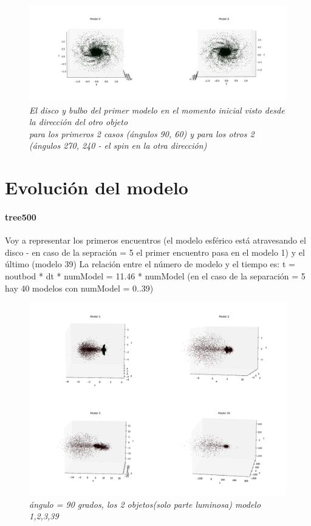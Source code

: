 \documentclass[12pt]{article} %
\renewcommand{\=}[1]{\stackrel{#1}{=}} %
\theoremstyle{definition}
\theoremstyle{remark}
\begin{document}
\begin{figure}[!ht]
 \centering
 \includegraphics[scale=0.2]{inimoddisco_sep5.png}
 \caption{\emph{El disco y bulbo del primer modelo en el momento inicial visto desde la dirección del otro objeto \\
para los primeros 2 casos (ángulos 90, 60) y para los otros 2 (ángulos 270, 240 - el spin en la otra dirección)}}
\end{figure}





\newpage
\section*{Evolución del modelo}
\paragraph{tree500}



Voy a representar los primeros encuentros (el modelo esférico está atravesando el disco - en caso de la sepración = 5 el primer encuentro pasa en el modelo 1) y el último (modelo 39)
La relación entre el número de modelo y el tiempo es: t = noutbod * dt * numModel = 11.46 *  numModel
(en el caso de la separación = 5 hay 40 modelos con numModel = 0..39)


\begin{figure}[!ht]
 \centering
 \includegraphics[scale=0.2]{90deg_m_sep5.png}
 \caption{\emph{ ángulo = 90 grados, los 2 objetos(solo parte luminosa) modelo 1,2,3,39 }}
\end{figure}
\end{document}
